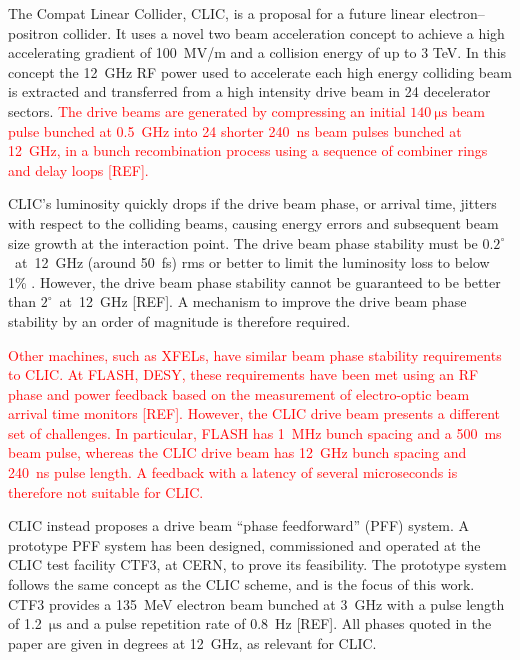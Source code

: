\documentclass[%
 reprint,
superscriptaddress,
 amsmath,amssymb,
 prl,
]{revtex4-1}
\begin{document}


The Compat Linear Collider, CLIC, \cite{CLICCDR} is a proposal for a future 
linear electron--positron collider. It uses a novel two beam acceleration 
concept to achieve a high accelerating gradient of 100~MV/m 
and a collision energy of up to 3 TeV. In this concept the 12~GHz RF power used 
to accelerate each high energy colliding beam is extracted and transferred from 
a high intensity drive beam in 24 decelerator sectors. \textcolor{red}{The 
drive beams are generated by compressing an initial 
\(140~\mathrm{\mu s}\) beam pulse bunched at 0.5~GHz into 24 shorter 240~ns 
beam pulses bunched at 12~GHz, in a bunch recombination process using a 
sequence 
of combiner rings and delay loops [REF]. }

CLIC's luminosity quickly drops if the drive beam phase, or arrival time, 
jitters with respect to the colliding beams, causing energy errors and 
subsequent beam size growth at the interaction point. The drive beam phase 
stability must be \(0.2^\circ\)~at~12~GHz (around 50~fs) rms or better to limit 
the luminosity loss to below 1\% \cite{CLICCDR}.  However, the drive beam phase 
stability cannot be guaranteed to be better than \(2^\circ\)~at~12~GHz [REF]. A 
mechanism to improve the drive beam phase stability by an order of magnitude is 
therefore required. 

\textcolor{red}{Other machines, such as XFELs, have similar beam phase 
	stability 
	requirements to CLIC. At FLASH, DESY, these requirements have been met 
	using an RF phase 
	and power feedback based on the measurement of electro-optic beam arrival 
	time monitors [REF]. However, the CLIC drive beam presents a different set 
	of challenges. In particular, FLASH has 1~MHz bunch spacing and a 500~ms 
	beam pulse, whereas the CLIC drive beam has 12~GHz bunch spacing and 240~ns 
	pulse length. A feedback with a latency of several microseconds is 
	therefore not suitable for CLIC.}

CLIC instead proposes a drive beam ``phase feedforward'' (PFF) 
system. 
A prototype PFF system has been designed, commissioned and operated at 
the CLIC test facility CTF3, at CERN, to prove its feasibility. The prototype 
system follows the same concept as the CLIC scheme, and is the focus 
of this work. CTF3 provides a 135~MeV electron beam bunched at 3~GHz with a 
pulse length of 
1.2~\(\mathrm{\mu s}\) and a pulse repetition rate of 0.8~Hz [REF]. All phases 
quoted in the paper are given in degrees at 12~GHz, as relevant for CLIC.
\end{document}

